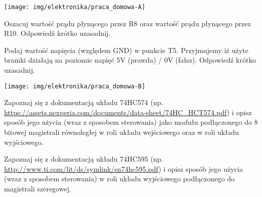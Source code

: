 \documentclass{pdfBooklets}
\begin{document}
\begin{center}
    \texttt{[image: img/elektronika/praca\_domowa-A]}
\end{center}

\begin{ZadanieDomowe} [2pkt]
Oszacuj wartość prądu płynącego przez R8 oraz wartość prądu płynącego przez R10. Odpowiedź krótko uzasadnij.
\end{ZadanieDomowe}

\begin{ZadanieDomowe} [1pkt]
Podaj wartość napięcia (względem GND) w punkcie T5. Przyjmujemy iż użyte bramki działają na poziomie napięć 5V (prawda) / 0V (fałsz). Odpowiedź krótko uzasadnij.
\end{ZadanieDomowe}

\begin{center}
    \texttt{[image: img/elektronika/praca\_domowa-B]}
\end{center}

\begin{ZadanieDomowe} [2pkt]
Zapoznaj się z dokumentacją układu 74HC574 (np. \url{https://assets.nexperia.com/documents/data-sheet/74HC_HCT574.pdf}) i opisz sposób jego użycia (wraz z sposobem sterowania) jako modułu podłączonego do 8 bitowej magistrali równoległej w roli układu wejściowego oraz w roli układu wyjściowego.
\end{ZadanieDomowe}

\begin{ZadanieDomowe} [2pkt]
Zapoznaj się z dokumentacją układu 74HC595 (np. \url{http://www.ti.com/lit/ds/symlink/sn74hc595.pdf}) i opisz sposób jego użycia (wraz z sposobem sterowania) w roli układu wyjściowego podłączonego do magistrali szeregowej.
\end{ZadanieDomowe}

\end{document}
